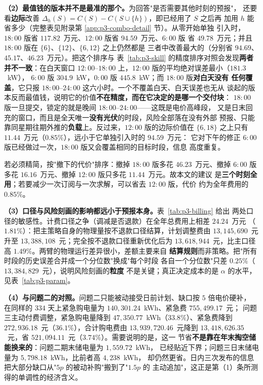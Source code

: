 \textbf{（2）最值钱的版本并不是最准的那个。}为回答"是否需要其他时刻的预报"，
还要看\textbf{边际}改善 $\Delta_h(S)=C(S)-C(S\cup\{h\})$，即已经用了 $S$ 之后再
加用 $h$ 能省多少（完整表见附录第 \ref{app:p3-combo-detail} 节）。从零开始单独
引入时，$18{:}00$ 版省 $117.82$~万元、$12{:}00$ 版省 $94.59$~万元、$6{:}00$ 版
省 $49.78$~万元；并且 $18{:}00$ 版在 $\{6\}$、$\{12\}$、$\{6,12\}$ 之上仍然都是
三者中改善最大的（分别省 $94.69$、$45.17$、$46.23$~万元）。把这个排序与
表~\ref{tab:p3-skill} 的精度排序对照会发现\textbf{两者并不一致}：在白天窗口
$12{:}00$--$18{:}00$ 上，$12{:}00$ 版的平均绝对误差最小（$181.3$~kW），
$6{:}00$ 版 $304.9$~kW，$0{:}00$ 版 $445.8$~kW；而 $18{:}00$ 版\textbf{对白天没有
任何覆盖}，它只报 $18{:}00$--$24{:}00$ 这六小时。一个不覆盖白天、白天误差也无从
谈起的版本反而最值钱，说明它的价值\textbf{不在精度，而在它决定的是哪一个交付块}：
$18{:}00$ 版一旦提交，锁定的就是晚间 $18{:}00$--$24{:}00$——这既是电价高峰段，
又是日末回充的窗口，而且是全天唯一\textbf{没有光伏}的时段，风险全部落在没有外部
预报、只能靠同星期往期外推的\textbf{负载}上。反过来，$12{:}00$ 版的边际价值在
$\{6,18\}$ 之上只有 $11.44$~万元（$0.85\%$），远小于它单独引入时的 $94.59$~万元：
它对下午的修正 $6{:}00$ 版已经做过一次，$18{:}00$ 版又会覆盖相同的目标时段，信息
高度重复。

若必须精简，按"撤下的代价"排序：撤掉 $18{:}00$ 版多花 $46.23$~万元、撤掉
$6{:}00$ 版多花 $16.16$~万元、撤掉 $12{:}00$ 版只多花 $11.44$~万元。故本文的建议
是\textbf{三个时刻全用}；若要减少一次订阅与一次求解，可以省去 $12{:}00$ 版，代价
约为全年费用的 $0.85\%$。

\textbf{（3）口径与风险刻画的影响都远小于预报本身。}表~\ref{tab:p3-billing} 给出
两处口径的敏感性。计费口径之争（调减是否退款）在全年总费用上相差 $24.24$~万元
（$1.81\%$）：把主策略自身的物理量按不退款口径结算，计划调整费由
$13{,}145{,}690$~元升至 $13{,}388{,}108$~元；完全按不退款口径重新优化后为
$13{,}618{,}944$~元，比主口径高 $1.49\%$。两臂的物理运行差异很小，差额主要来自
\textbf{结算规则}而非策略。把"所有时段的历史误差合并成一个分位数"换成"每个时段
各自一个分位数"只差 $0.25\%$（$13{,}384{,}829$~元），说明风险刻画的\textbf{粒度}
不是关键；真正决定成本的是 $\alpha$ 的水平，见表~\ref{tab:p3-param}。

\textbf{（4）与问题二的对照。}问题二只能被动接受日前计划、缺口按 $5$ 倍电价硬补，
在同样的 $334$ 天上紧急购电量为 $140{,}301.24$~kWh、紧急费 $755{,}499.17$~元；
问题三主动付费调整，紧急购电量降到 $47{,}350.77$~kWh（$33.8\%$）、紧急费降到
$272{,}936.18$~元（$36.1\%$），合计购电费由 $13{,}939{,}720.46$~元降到
$13{,}418{,}626.35$~元，省 $521{,}094.11$~元（$3.74\%$）。需要说明的是，这一
节省\textbf{不是靠在年末掏空储能换来的}：问题二期末储电量为 $1{,}559.72$~kWh，
已经贴近下界；问题三日末储电量为 $5{,}798.18$~kWh，比前者高 $4{,}238$~kWh，
却仍然更省。日内三次发布的信息把大部分缺口从"$5p$ 的被动补购"搬到了"$1.5p$ 的
主动追加"，这正是第（1）条所测得的单调性的经济含义。

